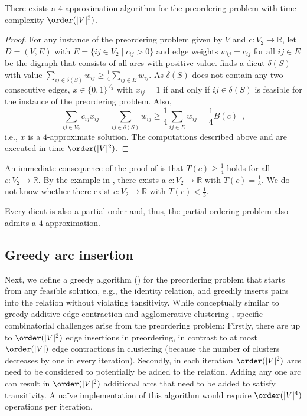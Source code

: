 \begin{theorem}\label{thm:4-approximation}
    There exists a $4$-approximation algorithm for the preordering problem with time complexity $\order(|V|^2)$.
\end{theorem}
%
\begin{proof}
    For any instance of the preordering problem given by $V$ and $c\colon V_2 \to \mathbb{R}$, let $D=(V, E)$ with $E=\{ij \in V_2 \mid c_{ij} > 0\}$ and edge weights $w_{ij} = c_{ij}$ for all $ij \in E$ be the digraph that consists of all arcs with positive value.
     finds a dicut $\delta(S)$ with value $\sum_{ij \in \delta(S)} w_{ij} \geq \frac{1}{4} \sum_{ij \in E} w_{ij}$.
    As $\delta(S)$ does not contain any two consecutive edges, $x \in \{0,1\}^{V_2}$ with $x_{ij} = 1$ if and only if $ij \in \delta(S)$ is feasible for the instance of the preordering problem.
    Also,
    \[
        \sum_{ij \in V_2} c_{ij} x_{ij} = \sum_{ij \in \delta(S)} w_{ij} \geq \frac{1}{4} \sum_{ij \in E} w_{ij} = \frac{1}{4} B(c) \enspace ,
    \]
    i.e., $x$ is a $4$-approximate solution.
    The computations described above and  are executed in time $\order(|V|^2)$.
\end{proof}

\begin{remark}
An immediate consequence of the proof of  is that $T(c) \geq \frac{1}{4}$ holds for all $c \colon V_2 \to \mathbb{R}$.
By the example in , there exists a $c \colon V_2 \to \mathbb{R}$ with $T(c) = \frac{1}{3}$. 
We do not know whether there exist $c \colon V_2 \to \mathbb{R}$ with $T(c) < \frac{1}{3}$.
\end{remark}

\begin{remark}
Every dicut is also a partial order and, thus, the partial ordering problem also admits a $4$-approximation.
\end{remark}



\subsection{Greedy arc insertion}

Next, we define a greedy algorithm () for the preordering problem that starts from any feasible solution, e.g., the identity relation, and greedily inserts pairs into the relation without violating tansitivity.
While conceptually similar to greedy additive edge contraction \citep{keuper2015efficient} and agglomerative clustering \citep{bailoni2022gasp}, specific combinatorial challenges arise from the preordering problem:
Firstly, there are up to $\order(|V|^2)$ edge insertions in preordering, in contrast to at most $\order(|V|)$ edge contractions in clustering (because the number of clusters decreases by one in every iteration).
Secondly, in each iteration $\order(|V|^2)$ arcs need to be considered to potentially be added to the relation.
Adding any one arc can result in $\order(|V|^2)$ additional arcs that need to be added to satisfy transitivity.
A na\"ive implementation of this algorithm would require $\order(|V|^4)$ operations per iteration.

